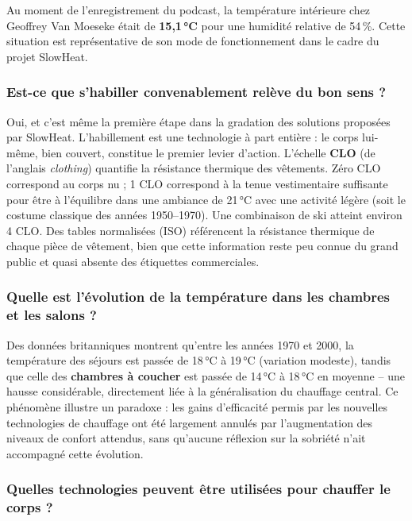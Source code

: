 Au moment de l'enregistrement du podcast, la température intérieure chez Geoffrey Van Moeseke était de \textbf{15,1\,°C} pour une humidité relative de 54\,\%. Cette situation est représentative de son mode de fonctionnement dans le cadre du projet SlowHeat.

\subsubsection{Est-ce que s'habiller convenablement relève du bon sens ?}

Oui, et c'est même la première étape dans la gradation des solutions proposées par SlowHeat. L'habillement est une technologie à part entière : le corps lui-même, bien couvert, constitue le premier levier d'action. L'échelle \textbf{CLO} (de l'anglais \textit{clothing}) quantifie la résistance thermique des vêtements. Zéro CLO correspond au corps nu ; 1 CLO correspond à la tenue vestimentaire suffisante pour être à l'équilibre dans une ambiance de 21\,°C avec une activité légère (soit le costume classique des années 1950--1970). Une combinaison de ski atteint environ 4 CLO. Des tables normalisées (ISO) référencent la résistance thermique de chaque pièce de vêtement, bien que cette information reste peu connue du grand public et quasi absente des étiquettes commerciales.

\subsubsection{Quelle est l'évolution de la température dans les chambres et les salons ?}

Des données britanniques montrent qu'entre les années 1970 et 2000, la température des séjours est passée de 18\,°C à 19\,°C (variation modeste), tandis que celle des \textbf{chambres à coucher} est passée de 14\,°C à 18\,°C en moyenne -- une hausse considérable, directement liée à la généralisation du chauffage central. Ce phénomène illustre un paradoxe : les gains d'efficacité permis par les nouvelles technologies de chauffage ont été largement annulés par l'augmentation des niveaux de confort attendus, sans qu'aucune réflexion sur la sobriété n'ait accompagné cette évolution.

\subsubsection{Quelles technologies peuvent être utilisées pour chauffer le corps ?}

